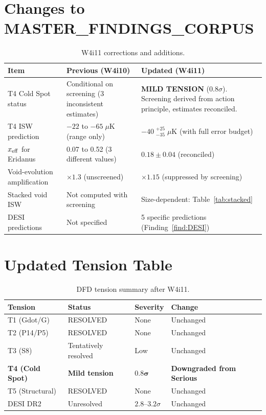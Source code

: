 \documentclass[11pt,a4paper]{article}
\begin{document}
\section{Changes to MASTER\_FINDINGS\_CORPUS}
\label{sec:changes}

\begin{table}[H]
\centering
\caption{W4i11 corrections and additions.}
\begin{tabular}{p{3.5cm}p{4cm}p{4cm}}
\toprule
\textbf{Item} & \textbf{Previous (W4i10)} & \textbf{Updated (W4i11)} \\
\midrule
T4 Cold Spot status & Conditional on screening
  (3 inconsistent estimates) & \textbf{MILD TENSION} ($0.8\sigma$).
  Screening derived from action principle, estimates reconciled. \\
T4 ISW prediction & $-22$ to $-65\;\mu$K (range only) &
  $-40\;{}^{+25}_{-35}\;\mu$K (with full error budget) \\
$x_{\rm eff}$ for Eridanus & 0.07 to 0.52 (3 different values) &
  $0.18 \pm 0.04$ (reconciled) \\
Void-evolution amplification & $\times 1.3$ (unscreened) &
  $\times 1.15$ (suppressed by screening) \\
Stacked void ISW & Not computed with screening &
  Size-dependent: Table~\ref{tab:stacked} \\
DESI predictions & Not specified & 5 specific predictions
  (Finding~\ref{find:DESI}) \\
\bottomrule
\end{tabular}
\end{table}


\section{Updated Tension Table}
\label{sec:tension-table}

\begin{table}[H]
\centering
\caption{DFD tension summary after W4i11.}
\begin{tabular}{llll}
\toprule
\textbf{Tension} & \textbf{Status} & \textbf{Severity} &
\textbf{Change} \\
\midrule
T1 (Gdot/G) & RESOLVED & None & Unchanged \\
T2 (P14/P5) & RESOLVED & None & Unchanged \\
T3 (S8) & Tentatively resolved & Low & Unchanged \\
\textbf{T4 (Cold Spot)} & \textbf{Mild tension} & $\mathbf{0.8\sigma}$ &
  \textbf{Downgraded from Serious} \\
T5 (Structural) & RESOLVED & None & Unchanged \\
DESI DR2 & Unresolved & $2.8$--$3.2\sigma$ & Unchanged \\
\bottomrule
\end{tabular}
\end{table}
\end{document}
